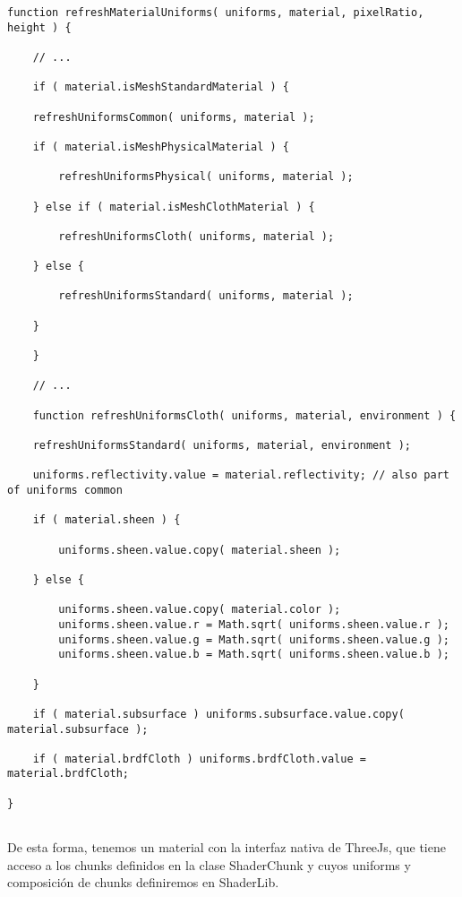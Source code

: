     \begin{lstlisting}[caption=Clase WebGLMaterials]
function refreshMaterialUniforms( uniforms, material, pixelRatio, height ) {

    // ...

    if ( material.isMeshStandardMaterial ) {

    refreshUniformsCommon( uniforms, material );

    if ( material.isMeshPhysicalMaterial ) {

        refreshUniformsPhysical( uniforms, material );

    } else if ( material.isMeshClothMaterial ) {

        refreshUniformsCloth( uniforms, material );

    } else {

        refreshUniformsStandard( uniforms, material );

    }

    }

    // ...

    function refreshUniformsCloth( uniforms, material, environment ) {

    refreshUniformsStandard( uniforms, material, environment );

    uniforms.reflectivity.value = material.reflectivity; // also part of uniforms common

    if ( material.sheen ) {

        uniforms.sheen.value.copy( material.sheen );

    } else {

        uniforms.sheen.value.copy( material.color );
        uniforms.sheen.value.r = Math.sqrt( uniforms.sheen.value.r );
        uniforms.sheen.value.g = Math.sqrt( uniforms.sheen.value.g );
        uniforms.sheen.value.b = Math.sqrt( uniforms.sheen.value.b );

    }

    if ( material.subsurface ) uniforms.subsurface.value.copy( material.subsurface );

    if ( material.brdfCloth ) uniforms.brdfCloth.value = material.brdfCloth;

}
        
    \end{lstlisting}

    De esta forma, tenemos un material con la interfaz nativa de ThreeJs, que tiene acceso a los
    chunks definidos en la clase ShaderChunk y cuyos uniforms y composici\'on de chunks definiremos
    en ShaderLib.\newline

